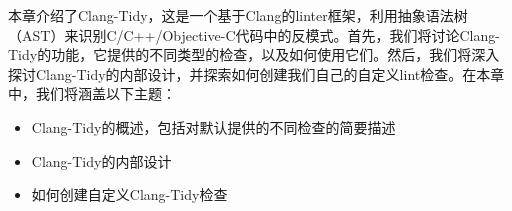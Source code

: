 

本章介绍了Clang-Tidy，这是一个基于Clang的linter框架，利用抽象语法树（AST）来识别C/C++/Objective-C代码中的反模式。首先，我们将讨论Clang-Tidy的功能，它提供的不同类型的检查，以及如何使用它们。然后，我们将深入探讨Clang-Tidy的内部设计，并探索如何创建我们自己的自定义lint检查。在本章中，我们将涵盖以下主题：

\begin{itemize}
\item
Clang-Tidy的概述，包括对默认提供的不同检查的简要描述

\item
Clang-Tidy的内部设计

\item
如何创建自定义Clang-Tidy检查
\end{itemize}